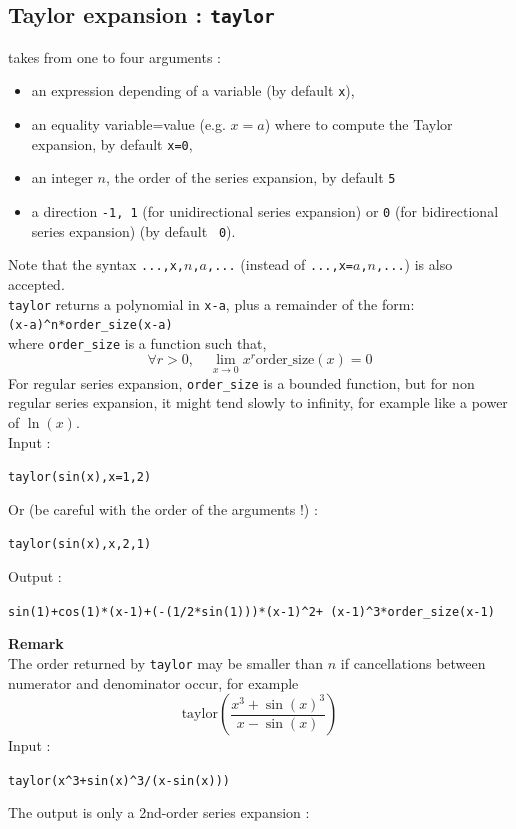 \documentclass[a4paper,11pt]{book}
\begin{document}
\subsection{Taylor expansion : {\tt taylor}} 
 takes from one to four arguments :
\begin{itemize}
\item an expression depending of a variable (by default {\tt x}),
\item an equality variable=value (e.g. $x=a$) where to compute
the Taylor expansion, by default {\tt x=0}, 
\item an integer $n$, the order of the series expansion,
by default {\tt 5}
\item a direction  {\tt -1, 1} (for unidirectional series expansion)
  or {\tt 0} (for bidirectional series expansion) (by default {\tt
    0}).
\end{itemize}
Note that the syntax {\tt ...,x,$n$,$a$,...} 
(instead of {\tt ...,x=$a$,$n$,...}) is also accepted.\\
{\tt taylor} returns  a polynomial in {\tt x-a}, plus a remainder 
of the form:\\
 {\tt (x-a)\verb|^|n*order\_size(x-a)}\\
where {\tt order\_size} is a function such that,
\[ \forall r>0, \quad \lim_{x\rightarrow 0} x^r \mbox{order\_size}(x) = 0 \]
For regular series expansion, {\tt order\_size} is a bounded function,
but for non regular series expansion, it might tend slowly to
infinity, for example like a power of $\ln(x)$.\\
Input :
\begin{center}{\tt taylor(sin(x),x=1,2)}\end{center}
Or (be careful with the  order of the arguments !) :
\begin{center}{\tt taylor(sin(x),x,2,1)}\end{center}
Output :
\begin{center}{\tt sin(1)+cos(1)*(x-1)+(-(1/2*sin(1)))*(x-1)\verb|^|2+ (x-1)\verb|^|3*order\_size(x-1)}\end{center}
{\bf Remark}\\
The order returned by {\tt taylor} may be smaller than $n$ if
cancellations between numerator and denominator occur, for example
\[ \mbox{taylor}(\frac{x^3+\sin(x)^3}{x-\sin(x)}) \]
Input :
\begin{center}{\tt taylor(x\verb|^|3+sin(x)\verb|^|3/(x-sin(x)))}\end{center}
The output is only a 2nd-order series expansion :
\end{document}
